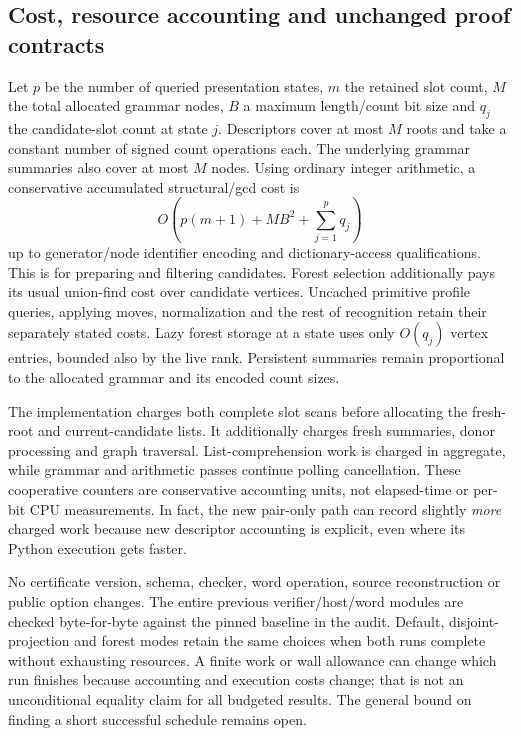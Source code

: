 \subsection{Cost, resource accounting and unchanged proof contracts}

Let $p$ be the number of queried presentation states, $m$ the retained slot
count, $M$ the total allocated grammar nodes, $B$ a maximum length/count bit
size and $q_j$ the candidate-slot count at state $j$. Descriptors cover at
most $M$ roots and take a constant number of signed count operations each.
The underlying grammar summaries also cover at most $M$ nodes. Using ordinary
integer arithmetic, a conservative accumulated structural/gcd cost is
\[
 O\!\left(p(m+1)+MB^2+\sum_{j=1}^{p}q_j\right)
\]
up to generator/node identifier encoding and dictionary-access qualifications.
This is for preparing and filtering candidates. Forest selection additionally
pays its usual union-find cost over candidate vertices. Uncached primitive
profile queries, applying moves, normalization and the rest of recognition retain
their separately stated costs. Lazy forest storage at a state uses only
$O(q_j)$ vertex entries, bounded also by the live rank. Persistent summaries
remain proportional to the allocated grammar and its encoded count sizes.

The implementation charges both complete slot scans before allocating the
fresh-root and current-candidate lists. It additionally charges fresh
summaries, donor processing and graph traversal. List-comprehension work is
charged in aggregate, while grammar and arithmetic passes continue polling
cancellation. These cooperative counters are conservative accounting units,
not elapsed-time or per-bit CPU measurements. In fact, the new pair-only
path can record slightly \emph{more} charged work because new descriptor
accounting is explicit, even where its Python execution gets faster.

No certificate version, schema, checker, word operation, source reconstruction
or public option changes. The entire previous verifier/host/word modules are
checked byte-for-byte against the pinned baseline in the audit. Default,
disjoint-projection and forest modes retain the same choices when both runs
complete without exhausting resources. A finite work or wall allowance can
change which run finishes because accounting and execution costs change;
that is not an unconditional equality claim for all budgeted results.
The general bound on finding a short successful schedule remains open.

